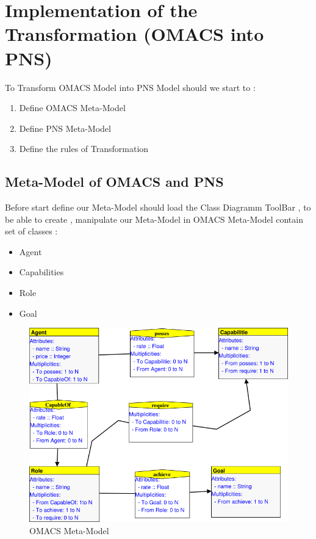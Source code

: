  

\section{Implementation of the Transformation (OMACS into PNS)\label{sec:OMACS into PNS} }%
To Transform OMACS Model into PNS Model should we start to :
\begin{enumerate}
\item Define OMACS Meta-Model 
\item Define PNS Meta-Model
\item Define the rules of Transformation
\end{enumerate}


\subsection{ Meta-Model of OMACS  and PNS } 
Before start define our Meta-Model should load the Class Diagramm ToolBar , to be able to create , manipulate our Meta-Model
in OMACS Meta-Model contain set of classes :

\begin{itemize}

\item Agent  
\item Capabilities
\item Role
\item Goal

\end{itemize}
 
\begin{figure}[th]
		\centering
 	\includegraphics[scale=0.7]{Chapiter3/img/omacs_meta}
	\caption{\label{fig:OMACS Meta-Model}OMACS Meta-Model}
\end{figure} 
 
